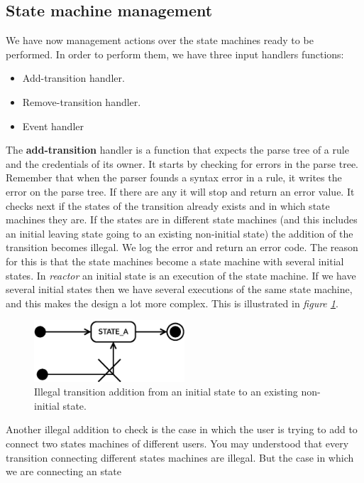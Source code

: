 \subsection{State machine management}
\label{sec:smman}
We have now management actions over the state machines ready to be performed. In order to perform them, we have three input handlers 
functions:
\begin{itemize}
  \item Add-transition handler.
  \item Remove-transition handler.
  \item Event handler
\end{itemize}
The {\bf add-transition} handler is a function that expects the parse tree of a rule and the credentials of its owner. It starts by checking 
for errors in the parse tree. Remember that when the parser founds a syntax error in a rule, it writes the error on the parse tree. If 
there are any it will stop and return an error value. It checks next if the states of
the transition already exists and in which state machines they are. If the states are in different state machines (and this includes an
initial leaving state going to an existing non-initial state) the addition of the transition becomes illegal. We log the error and return 
an error code. The reason for this is that the state machines become a state machine with several initial states. In \emph{reactor} an 
initial state is an execution of the state machine. If we have several initial states then we have several executions of the same state
machine, and this makes the design a lot more complex. This is illustrated in \emph{figure \ref{fig:illegalsm1}}.\\
\begin{figure}[b]
  \centering
  \includegraphics[width=0.5\textwidth,keepaspectratio]{img/illegalsm1}
  \caption{Illegal transition addition from an initial state to an existing non-initial state.}
  \label{fig:illegalsm1}
\end{figure}
Another illegal addition to check is the case in which the user is trying to add to connect two states machines of different users.
You may understood that every transition connecting different states machines are illegal. But the case in which we are connecting an state
